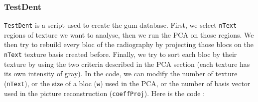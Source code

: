\subsubsection*{TestDent}
\texttt{TestDent} is a script used to create the gum database. First, we select \texttt{nText} regions of texture we want to analyse, then we run the PCA on those regions. We then try to rebuild every bloc of the radiography by projecting those blocs on the \texttt{nText} texture basis created before. Finally, we try to sort each bloc by their texture by using the two criteria described in the PCA section (each texture has its own intensity of gray). In the code, we can modify the number of texture (\texttt{nText}), or the size of a bloc (\texttt{w}) used in the PCA, or the number of basis vector used in the picture reconstruction (\texttt{coeffProj}). Here is the code :



